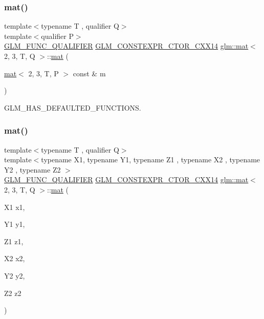 \mbox{\label{structglm_1_1mat_3_012_00_013_00_01_t_00_01_q_01_4_a54292d5f34dca47737a3037100d133cb}} 
\subsubsection{\texorpdfstring{mat()}{mat()}\hspace{0.1cm}{\footnotesize\ttfamily [18/21]}}
{\footnotesize\ttfamily template$<$typename T , qualifier Q$>$ \\
template$<$qualifier P$>$ \\
\hyperlink{setup_8hpp_a33fdea6f91c5f834105f7415e2a64407}{G\+L\+M\+\_\+\+F\+U\+N\+C\+\_\+\+Q\+U\+A\+L\+I\+F\+I\+ER} \hyperlink{setup_8hpp_a0900f9145e68bf6061b6f5e7be3fa751}{G\+L\+M\+\_\+\+C\+O\+N\+S\+T\+E\+X\+P\+R\+\_\+\+C\+T\+O\+R\+\_\+\+C\+X\+X14} \hyperlink{structglm_1_1mat}{glm\+::mat}$<$ 2, 3, T, Q $>$\+::\hyperlink{structglm_1_1mat}{mat} (\begin{DoxyParamCaption}\item[{\hyperlink{structglm_1_1mat}{mat}$<$ 2, 3, T, P $>$ const \&}]{m }\end{DoxyParamCaption})}



G\+L\+M\+\_\+\+H\+A\+S\+\_\+\+D\+E\+F\+A\+U\+L\+T\+E\+D\+\_\+\+F\+U\+N\+C\+T\+I\+O\+NS. 

\mbox{\label{structglm_1_1mat_3_012_00_013_00_01_t_00_01_q_01_4_a12429e3e8f84a37878a67490604c7173}} 
\subsubsection{\texorpdfstring{mat()}{mat()}\hspace{0.1cm}{\footnotesize\ttfamily [19/21]}}
{\footnotesize\ttfamily template$<$typename T , qualifier Q$>$ \\
template$<$typename X1, typename Y1, typename Z1 , typename X2 , typename Y2 , typename Z2 $>$ \\
\hyperlink{setup_8hpp_a33fdea6f91c5f834105f7415e2a64407}{G\+L\+M\+\_\+\+F\+U\+N\+C\+\_\+\+Q\+U\+A\+L\+I\+F\+I\+ER} \hyperlink{setup_8hpp_a0900f9145e68bf6061b6f5e7be3fa751}{G\+L\+M\+\_\+\+C\+O\+N\+S\+T\+E\+X\+P\+R\+\_\+\+C\+T\+O\+R\+\_\+\+C\+X\+X14} \hyperlink{structglm_1_1mat}{glm\+::mat}$<$ 2, 3, T, Q $>$\+::\hyperlink{structglm_1_1mat}{mat} (\begin{DoxyParamCaption}\item[{X1}]{x1,  }\item[{Y1}]{y1,  }\item[{Z1}]{z1,  }\item[{X2}]{x2,  }\item[{Y2}]{y2,  }\item[{Z2}]{z2 }\end{DoxyParamCaption})}

